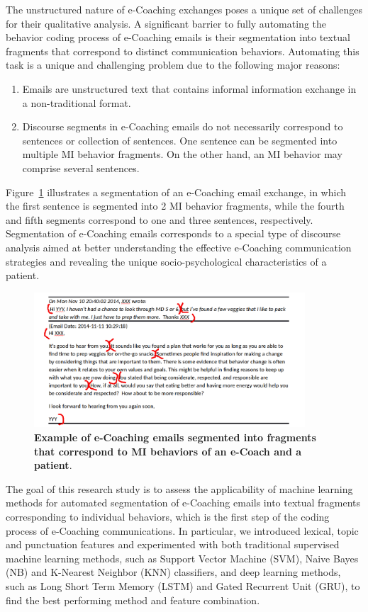\documentclass{amia}
\begin{document}
The unstructured nature of e-Coaching exchanges poses a unique set of challenges for their qualitative analysis. A significant barrier to fully automating the behavior coding process of e-Coaching emails is their segmentation into textual fragments that correspond to distinct communication behaviors. Automating this task is a unique and challenging problem due to the following major reasons:

\begin{enumerate}
\item Emails are unstructured text that contains informal information exchange in a non-traditional format.
\item Discourse segments in e-Coaching emails do not necessarily correspond to sentences or collection of sentences. One sentence can be segmented into multiple MI behavior fragments. On the other hand, an MI behavior may comprise several sentences.
\end{enumerate}

Figure~\ref{fig:text-segment} illustrates a segmentation of an e-Coaching email exchange, in which the first sentence is segmented into 2 MI behavior fragments, while the fourth and fifth segments correspond to one and three sentences, respectively. Segmentation of e-Coaching emails corresponds to a special type of discourse analysis \cite{webber2012discourse} aimed at better understanding the effective e-Coaching communication strategies and revealing the unique socio-psychological characteristics of a patient.

\begin{figure}[!htb]
    \centering
    \includegraphics[width=0.9\textwidth]{figures/segment-example.png}
    \caption{\textbf{Example of e-Coaching emails segmented into fragments that correspond to MI behaviors of an e-Coach and a patient}.}
    \label{fig:text-segment}
\end{figure}

The goal of this research study is to assess the applicability of machine learning methods for automated segmentation of e-Coaching emails into textual fragments corresponding to individual behaviors, which is the first step of the coding process of e-Coaching communications. In particular, we introduced lexical, topic and punctuation features and experimented with both traditional supervised machine learning methods, such as Support Vector Machine (SVM), Naive Bayes (NB) and K-Nearest Neighbor (KNN) classifiers, and deep learning methods, such as Long Short Term Memory (LSTM) and Gated Recurrent Unit (GRU), to find the best performing method and feature combination. 
\end{document}
